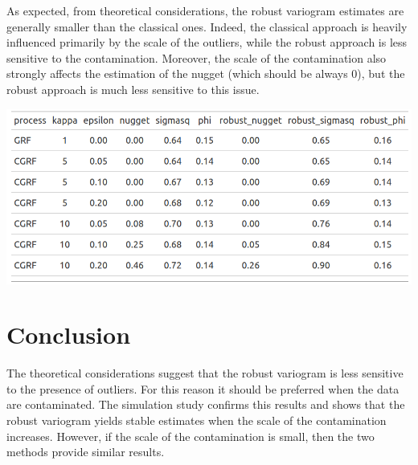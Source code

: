 \documentclass[
  12pt]{article}
\begin{document}
As expected, from theoretical considerations, the robust variogram
estimates are generally smaller than the classical ones. Indeed, the
classical approach is heavily influenced primarily by the scale of the
outliers, while the robust approach is less sensitive to the
contamination. Moreover, the scale of the contamination also strongly
affects the estimation of the nugget (which should be always 0), but the
robust approach is much less sensitive to this issue.

\begin{center}
\includegraphics[width=6.25in,height=\textheight]{img/variog_est_ols.png}
\end{center}

\section{Conclusion}\label{conclusion}

The theoretical considerations suggest that the robust variogram is less
sensitive to the presence of outliers. For this reason it should be
preferred when the data are contaminated. The simulation study confirms
this results and shows that the robust variogram yields stable estimates
when the scale of the contamination increases. However, if the scale of
the contamination is small, then the two methods provide similar
results.


  
\end{document}
